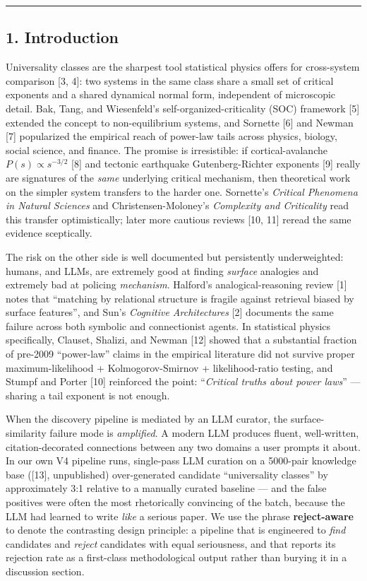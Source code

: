 \documentclass[
  letterpaper,
  11pt]{article}
\begin{document}
\begin{center}\rule{0.5\linewidth}{0.5pt}\end{center}

\subsection{1. Introduction}\label{introduction}

Universality classes are the sharpest tool statistical physics offers
for cross-system comparison {[}3, 4{]}: two systems in the same class
share a small set of critical exponents and a shared dynamical normal
form, independent of microscopic detail. Bak, Tang, and Wiesenfeld's
self-organized-criticality (SOC) framework {[}5{]} extended the concept
to non-equilibrium systems, and Sornette {[}6{]} and Newman {[}7{]}
popularized the empirical reach of power-law tails across physics,
biology, social science, and finance. The promise is irresistible: if
cortical-avalanche \(P(s) \propto s^{-3/2}\) {[}8{]} and tectonic
earthquake Gutenberg-Richter exponents {[}9{]} really are signatures of
the \emph{same} underlying critical mechanism, then theoretical work on
the simpler system transfers to the harder one. Sornette's
\emph{Critical Phenomena in Natural Sciences} and Christensen-Moloney's
\emph{Complexity and Criticality} read this transfer optimistically;
later more cautious reviews {[}10, 11{]} reread the same evidence
sceptically.

The risk on the other side is well documented but persistently
underweighted: humans, and LLMs, are extremely good at finding
\emph{surface} analogies and extremely bad at policing \emph{mechanism}.
Halford's analogical-reasoning review {[}1{]} notes that ``matching by
relational structure is fragile against retrieval biased by surface
features'', and Sun's \emph{Cognitive Architectures} {[}2{]} documents
the same failure across both symbolic and connectionist agents. In
statistical physics specifically, Clauset, Shalizi, and Newman {[}12{]}
showed that a substantial fraction of pre-2009 ``power-law'' claims in
the empirical literature did not survive proper maximum-likelihood +
Kolmogorov-Smirnov + likelihood-ratio testing, and Stumpf and Porter
{[}10{]} reinforced the point: ``\emph{Critical truths about power
laws}'' --- sharing a tail exponent is not enough.

When the discovery pipeline is mediated by an LLM curator, the
surface-similarity failure mode is \emph{amplified}. A modern LLM
produces fluent, well-written, citation-decorated connections between
any two domains a user prompts it about. In our own V4 pipeline runs,
single-pass LLM curation on a 5000-pair knowledge base ({[}13{]},
unpublished) over-generated candidate ``universality classes'' by
approximately 3:1 relative to a manually curated baseline --- and the
false positives were often the most rhetorically convincing of the
batch, because the LLM had learned to write \emph{like} a serious paper.
We use the phrase \textbf{reject-aware} to denote the contrasting design
principle: a pipeline that is engineered to \emph{find} candidates and
\emph{reject} candidates with equal seriousness, and that reports its
rejection rate as a first-class methodological output rather than
burying it in a discussion section.
\end{document}

